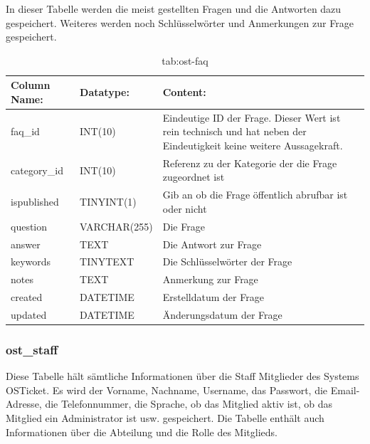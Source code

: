 In dieser Tabelle werden die meist gestellten Fragen und die Antworten dazu gespeichert. Weiteres werden noch Schlüsselwörter und Anmerkungen zur Frage gespeichert.

\begin{table}[h]
	\begin{tabular}{|p{3.5cm}|p{4cm}|p{7.2cm}|}
		\hline
		\textbf{Column Name:} & \textbf{Datatype:} & \textbf{Content:}\\
		\hline
		faq\_id & INT(10) & Eindeutige ID der Frage. Dieser Wert ist rein technisch und hat  neben der Eindeutigkeit keine weitere 
		Aussagekraft.\\
		\hline
		category\_id & INT(10) & Referenz zu der Kategorie der die Frage zugeordnet ist  \\
		\hline
		ispublished & TINYINT(1) & Gib an ob die Frage öffentlich abrufbar ist oder nicht\\
		\hline
		question & VARCHAR(255) & Die Frage\\
		\hline
		answer & TEXT & Die Antwort zur Frage\\
		\hline
		keywords & TINYTEXT & Die Schlüsselwörter der Frage \\
		\hline
		notes & TEXT & Anmerkung zur Frage\\
		\hline
		created & DATETIME & Erstelldatum der Frage\\
		\hline
		updated & DATETIME & Änderungsdatum der Frage\\
		\hline
	\end{tabular}
	\caption{tab:ost-faq}
\end{table}
\label{tab:ost_faq}

\subsubsection{ost\_staff}

Diese Tabelle hält sämtliche Informationen über die Staff Mitglieder des Systems OSTicket. Es wird der Vorname, Nachname, Username, das Passwort, die Email-Adresse, die Telefonnummer, die Sprache, ob das Mitglied aktiv ist, ob das Mitglied ein Administrator ist usw. gespeichert.
Die Tabelle enthält auch Informationen über die Abteilung und die Rolle des Mitglieds.


